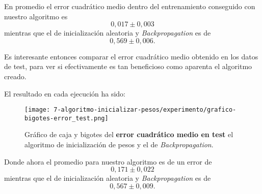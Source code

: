 En promedio el error cuadrático medio dentro del entrenamiento conseguido con nuestro algoritmo es 
\begin{equation}
    0,017 \pm 0,003
\end{equation}
mientras que el de inicialización aleatoria y \textit{Backpropagation} es de 
\begin{equation}
    0,569 \pm 0,006. 
\end{equation}

Es interesante entonces comparar el error cuadrático medio obtenido en los datos de test, para ver si efectivamente es tan beneficioso como aparenta el algoritmo creado. 

El resultado en cada ejecución ha sido: 

\begin{table}[H]
    \centering
    \caption{Error mínimo cuadrático \textbf{en test} tras finalizar las sucesivas repeticiones del algoritmo}
\end{table}


\begin{figure}[H]
    \centering
     \texttt{[image: 7-algoritmo-inicializar-pesos/experimento/grafico-bigotes-error\_test.png]}
     \caption{Gráfico de caja y bigotes del \textbf{error cuadrático medio en test } el algoritmo de inicialización de pesos y el de \textit{Backpropagation}.}
     \label{img07:error-test}
\end{figure}

Donde ahora el promedio para nuestro algoritmo es de un error de
\begin{equation}
    0,171 \pm 0,022
\end{equation}
mientras que el de inicialización aleatoria y \textit{Backpropagation} es de 
\begin{equation}
    0,567 \pm 0,009.
\end{equation}

